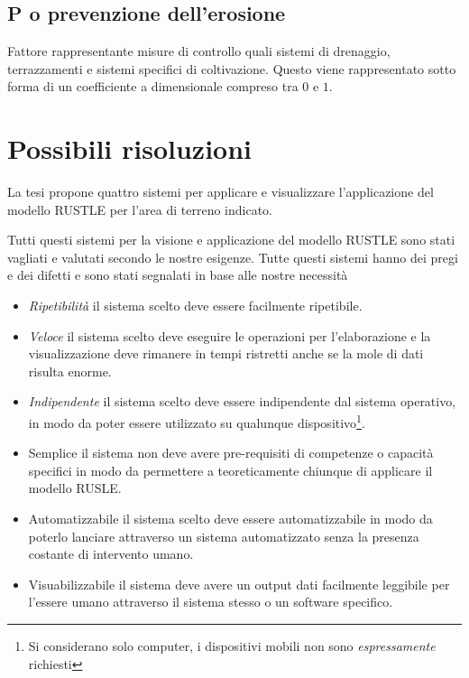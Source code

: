 \subsection{P o prevenzione dell'erosione}
Fattore rappresentante misure di controllo quali sistemi di drenaggio, terrazzamenti e sistemi specifici di coltivazione.
Questo viene rappresentato sotto forma di un coefficiente a dimensionale compreso tra $0$ e $1$.

\section{Possibili risoluzioni}
La tesi \cite{tesi:ambientale} propone quattro sistemi per applicare e visualizzare l'applicazione del modello RUSTLE per l'area di terreno indicato.

Tutti questi sistemi per la visione e applicazione del modello RUSTLE sono stati vagliati e valutati secondo le nostre esigenze. Tutte questi sistemi hanno dei pregi e dei difetti e sono stati segnalati in base alle nostre necessità

\begin{itemize}

	\item \textit{Ripetibilità} il sistema scelto deve essere facilmente ripetibile.

	\item \textit{Veloce} il sistema scelto deve eseguire le operazioni per l'elaborazione e la visualizzazione deve rimanere in tempi ristretti anche se la mole di dati risulta enorme.

	\item \textit{Indipendente} il sistema scelto deve essere indipendente dal sistema operativo, in modo da poter essere utilizzato su qualunque dispositivo\footnote{Si considerano solo computer, i dispositivi mobili non sono \textit{espressamente} richiesti}.

	\item{Semplice} il sistema non deve avere pre-requisiti di competenze o capacità specifici in modo da permettere a teoreticamente chiunque di applicare il modello RUSLE.

	\item{Automatizzabile} il sistema scelto deve essere automatizzabile in modo da poterlo lanciare attraverso un sistema automatizzato senza la presenza costante di intervento umano.

	\item{Visuabilizzabile} il sistema deve avere un output dati facilmente leggibile per l'essere umano attraverso il sistema stesso o un software specifico.

\end{itemize}

